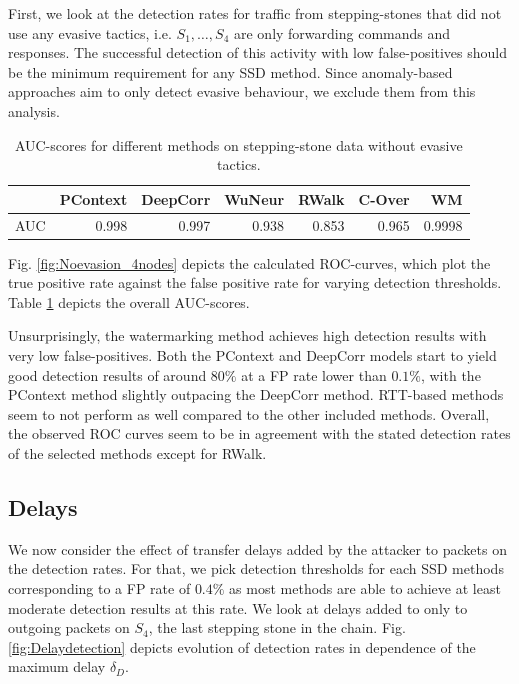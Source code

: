 \documentclass[runningheads,11pt]{llncs}\usepackage[]{graphicx}\usepackage[]{color}
\begin{document}
First, we look at the detection rates for traffic from stepping-stones that did not use any evasive tactics, i.e. $S_1,\dots,S_4$ are only forwarding commands and responses. The successful detection of this activity with low false-positives should be the minimum requirement for any SSD method. Since anomaly-based approaches aim to only detect evasive behaviour, we exclude them from this analysis. 

\begin{table}
\centering
\begin{tabular}{l|r|r|r|r|r|r}
  \hline
 & PContext & DeepCorr & WuNeur & RWalk & C-Over & WM \\ 
  \hline
AUC & 0.998 & 0.997 & 0.938 & 0.853 & 0.965 & 0.9998 \\ 
   \hline
\end{tabular}

\caption{AUC-scores for different methods on stepping-stone data without evasive tactics.}\label{Tab:dfAUC}

\vspace{-0.6cm}
\end{table}

Fig. \ref{fig:Noevasion_4nodes} depicts the calculated ROC-curves, which plot the true positive rate against the false positive rate for varying detection thresholds. Table \ref{Tab:dfAUC} depicts the overall AUC-scores.



Unsurprisingly, the watermarking method achieves high detection results with very low false-positives. Both the PContext and DeepCorr models start to yield good detection results of around $80\%$ at a FP rate lower than $0.1\%$, with the PContext method slightly outpacing the DeepCorr method. 
RTT-based methods seem to not perform as well compared to the other included methods. Overall, the observed ROC curves seem to be in agreement with the stated detection rates of the selected methods except for RWalk. %




\subsection{Delays}

We now consider the effect of transfer delays added by the attacker to packets on the detection rates. For that, we pick detection thresholds for each SSD methods corresponding to a FP rate of $0.4\%$ as most methods are able to achieve at least moderate detection results at this rate. 
We look at delays added to only to outgoing packets on $S_4$, the last stepping stone in the chain. Fig. \ref{fig:Delaydetection} depicts evolution of detection rates in dependence of the maximum delay $\delta_D$.
\end{document}
